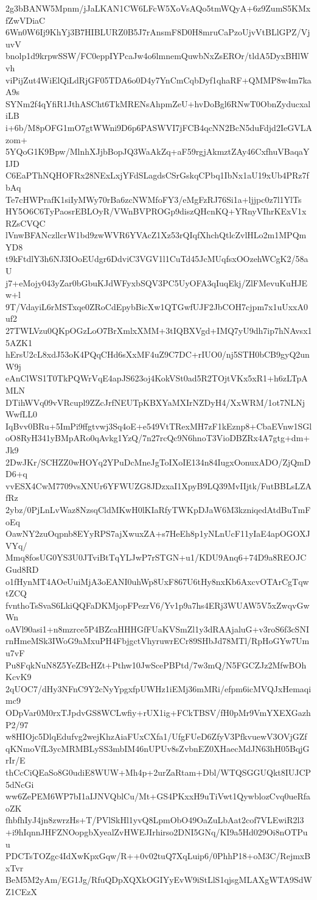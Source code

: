 2g3bBANW5Mpnm/jJaLKAN1CW6LFcW5XoVsAQo5tmWQyA+6z9ZumS5KMxfZwVDiaC
6Wn0W6Ij9KhYj3B7HIBLURZ0B5J7rAnsmF8D0H8mruCaPzoUjvVtBLlGPZ/VjuvV
bnolp1d9krpwSSW/FC0eppIYPcaJw4o6lmnemQuwbNxZsEROr/tldA5DyxBHlWvh
viPijZut4WiElQiLdRjGF05TDA6o0D4y7YnCmCqbDyf1qhaRF+QMMP8w4m7kaA9s
SYNm2f4qYfiR1JthASCht6TkMRENsAhpmZeU+hvDoBgl6RNwT0ObnZyducxaliLB
i+6b/M8pOFG1mO7gtWWni9D6p6PASWVI7jFCB4qcNN2BcN5duFdjd2IeGVLAzom+
5YQoG1K9Bpw/MlnhXJjbBopJQ3WaAkZq+aF59rgjAkmztZAy46CxfhuVBaqaYIJD
C6EaPThNQHOFRx28NExLxjYFdSLagdsCSrGskqCPbq1IbNx1aU19xUb4PRz7fbAq
Te7cHWPrafK1siIyMWy70rBa6zcNWMfoFY3/eMgFzRJ76Si1a+ljjpc0z7l1YlTs
HY5O6C6TyPaosrEBLOyR/VWnBVPROGp9diszQHcnKQ+YRnyVIhrKExV1xRZsCVQC
lVnwBFANczllcrW1bd9zwWVR6YVAcZ1Xz53rQIqfXhchQtlcZvlHLo2m1MPQmYD8
t9kFtdlY3h6NJ3IOoEUdgr6DdviC3VGV1l1CuTd45JcMUqfsxOOzehWCgK2/58aU
j7+eMojy043yZar0bGbuKJdWFyxbSQV3PC5UyOFA3qIuqEkj/ZlFMevuKuHJEw+l
9T/VdayiL6rMSTxqe0ZRoCdEpybBicXw1QTGwfUJF2JbCOH7cjpm7x1uUxxA0uf2
27TWLVzu0QKpOGzLoO7BrXmlxXMM+3tIQBXVgd+IMQ7yU9dh7ip7hNAvsx15AZK1
hErsU2cL8xdJ53oK4PQqCHd6sXxMF4uZ9C7DC+rIUO0/nj5STH0bCB9gyQ2unW9j
eAnClWS1T0TkPQWrVqE4apJS623oj4KokVSt0ad5R2TOjtVKx5xR1+h6zLTpAMLN
DTihWVq09vVRcupl9ZZcJrfNEUTpKBXYaMXIrNZDyH4/XxWRM/1ot7NLNjWwfLL0
IqBvv0BRu+5ImPi9ffgtvwj3Sq4oE+e549VtTRexMH7zF1kEznp8+CbaEVnw1SGl
oO8RyH341yBMpARo0qAvkg1YzQ/7n27rcQc9N6hnoT3VioDBZRx4A7gtg+dm+Jk9
2DwJKr/SCHZZ0wHOYq2YPuDcMneJgToIXoIE134n84IugxOonuxADO/ZjQmDD6+q
vvESX4CwM7709vsXNUr6YFWUZG8JDzxaI1XpyB9LQ39MvIIjtk/FutBBLsLZAfRz
2ybz/0PjLnLvWaz8NzsqCldMKwH0lKIaRfyTWKpDJaW6M3kzniqedAtdBuTmFoEq
OawNY2zuOqpnb8EYyRPS7ajXwuxZA+s7HeEh8p1yNLnUcF11yIaE4apOGOXJVYq/
Mmq8fosUG0YS3U0JTviBtTqYLJwP7rSTGN+u1/KDU9Anq6+74D9a8REOJCGud8RD
o1fHynMT4AOeUuiMjA3oEANI0uhWp8UxF867U6tHy8nxKb6AxcvOTArCgTqwtZCQ
fvnthoTsSvaS6LkiQQFaDKMjopFPezrV6/Yv1p9a7hs4ERj3WUAW5V5xZwqvGwWn
oAVl90asi1+n8mzrce5P4BZcaHHHGfFUaKVSmZl1y3dRAAjaluG+v3roS6f3cSNI
rnHmeMSk3IWoG9aMxuPH4FbjgctVhyruwrECr89SHbJd78MTl/RpHoGYw7Umu7vF
Pu8FqkNuN8Z5YeZBcHZt+Pthw10JwScePBPtd/7w3mQ/N5FGCZJz2MfwBOhKcvK9
2qUOC7/dHy3NFnC9Y2cNyYpgxfpUWHz1iEMj36mMRi/efpm6icMVQJxHemaqimc9
ODpVar0M0rxTJpdvGS8WCLwfiy+rUX1ig+FCkTBSV/fH0pMr9VmYXEXGazhP2/97
w8HIOjc5DlqEdufvg2wejKhzAiaFUxCXfa1/UfgFUeD6ZfyV3PfkvuewV3OVjGZf
qKNmoVfL3ycMRMBLySS3mbIM46nUPUv8sZvbnEZ0XHaecMdJN63hH05BqjGrIr/E
thCcCiQEaSo8G0udiE8WUW+Mh4p+2urZaRtam+Dbl/WTQSGGUQkt8IUJCP5dNcGi
ww6ZePEM6WP7bI1aIJNVQblCu/Mt+GS4PKxxH9uTiVwt1QywblozCvq0ueRfaoZK
fhbfhIyJ4jn8zwrzHs+T/PVlSkHl1yvQ8LpmObO49OaZuLbAat2cof7VLEwiR2l3
+i9hIqnnJHFZNOopgbXyealZvHWEJIrhirso2DNI5GNq/KI9a5Hd029Oi8nOTPuu
PDCTsTOZgc4IdXwKpxGqw/R++0v02tuQ7XqLuip6/0PhhP18+oM3C/RejmxBxTvr
BeM5M2yAm/EG1Jg/RfuQDpXQXkOGIYyEvW9iStLlS1qjsgMLAXgWTA9SdWZ1CEzX
